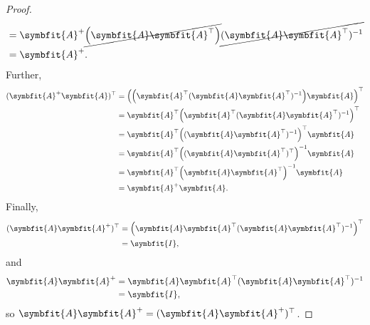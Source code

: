 \documentclass{article}
\theoremstyle{definition}
\newcommand{\mat}[1]{\symbfit{#1}}
\begin{document}
\begin{enumerate}[leftmargin=\labelsep]
\begin{proof}
\begin{align*}
			                                & = \mat{A}^+\cancel{\qty(\mat{A}\mat{A}^{\top})}\cancel{(\mat{A}\mat{A}^{\top})^{-1}} \\
			                                & = \mat{A}^+.
		      \end{align*}
		      Further,
		      \begin{align*}
			      (\mat{A}^+\mat{A})^\top & = \qty(\qty(\mat{A}^\top(\mat{A}\mat{A}^\top)^{-1})\mat{A})^{\top} \\
			                              & = \mat{A}^\top \qty(\mat{A}^\top(\mat{A}\mat{A}^\top)^{-1})^\top   \\
			                              & = \mat{A}^\top \qty((\mat{A}\mat{A}^\top)^{-1})^\top \mat{A}       \\
			                              & = \mat{A}^\top \qty((\mat{A}\mat{A}^\top)^\top)^{-1} \mat{A}       \\
			                              & = \mat{A}^\top \qty(\mat{A}\mat{A}^\top)^{-1} \mat{A}              \\
			                              & = \mat{A}^+\mat{A}.
		      \end{align*}
		      Finally,
		      \begin{align*}
			      (\mat{A}\mat{A}^+)^\top & = \qty(\mat{A}\mat{A}^\top(\mat{A}\mat{A}^\top)^{-1})^\top \\
			                              & = \mat{I},
		      \end{align*}
		      and
		      \begin{align*}
			      \mat{A}\mat{A}^+ & = \mat{A}\mat{A}^\top(\mat{A}\mat{A}^\top)^{-1} \\
			                       & = \mat{I},
		      \end{align*}
		      so \(\mat{A}\mat{A}^+ = (\mat{A}\mat{A}^+)^\top\).
	      \end{proof}


\end{enumerate}
\end{document}

